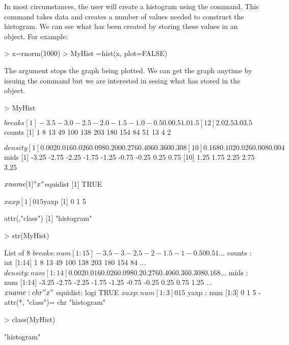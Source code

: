 In most circumstances, the user will create a histogram using the  command. This command takes data and creates a number of values needed to construct the histogram. We can see what has been created by storing these values in an object. For example: 
\begin{Schunk}
\begin{Sinput}
> x=rnorm(1000) 
> MyHist =hist(x, plot=FALSE) 
\end{Sinput}
\end{Schunk}
The  argument stops the graph being plotted. We can get the graph anytime by issuing the  command but we are interested in seeing what \R{} has stored in the  object.  
\begin{Schunk}
\begin{Sinput}
> MyHist 
\end{Sinput}
\begin{Soutput}
$breaks
 [1] -3.5 -3.0 -2.5 -2.0 -1.5 -1.0 -0.5  0.0  0.5  1.0  1.5
[12]  2.0  2.5  3.0  3.5

$counts
 [1]   1   8  13  49 100 138 203 180 154  84  51  13   4   2

$density
 [1] 0.002 0.016 0.026 0.098 0.200 0.276 0.406 0.360 0.308
[10] 0.168 0.102 0.026 0.008 0.004

$mids
 [1] -3.25 -2.75 -2.25 -1.75 -1.25 -0.75 -0.25  0.25  0.75
[10]  1.25  1.75  2.25  2.75  3.25

$xname
[1] "x"

$equidist
[1] TRUE

$xaxp
[1] 0 1 5

$yaxp
[1] 0 1 5

attr(,"class")
[1] "histogram"
\end{Soutput}
\begin{Sinput}
> str(MyHist) 
\end{Sinput}
\begin{Soutput}
List of 8
 $ breaks  : num [1:15] -3.5 -3 -2.5 -2 -1.5 -1 -0.5 0 0.5 1 ...
 $ counts  : int [1:14] 1 8 13 49 100 138 203 180 154 84 ...
 $ density : num [1:14] 0.002 0.016 0.026 0.098 0.2 0.276 0.406 0.36 0.308 0.168 ...
 $ mids    : num [1:14] -3.25 -2.75 -2.25 -1.75 -1.25 -0.75 -0.25 0.25 0.75 1.25 ...
 $ xname   : chr "x"
 $ equidist: logi TRUE
 $ xaxp    : num [1:3] 0 1 5
 $ yaxp    : num [1:3] 0 1 5
 - attr(*, "class")= chr "histogram"
\end{Soutput}
\begin{Sinput}
> class(MyHist) 
\end{Sinput}
\begin{Soutput}
[1] "histogram"
\end{Soutput}
\end{Schunk}
 

